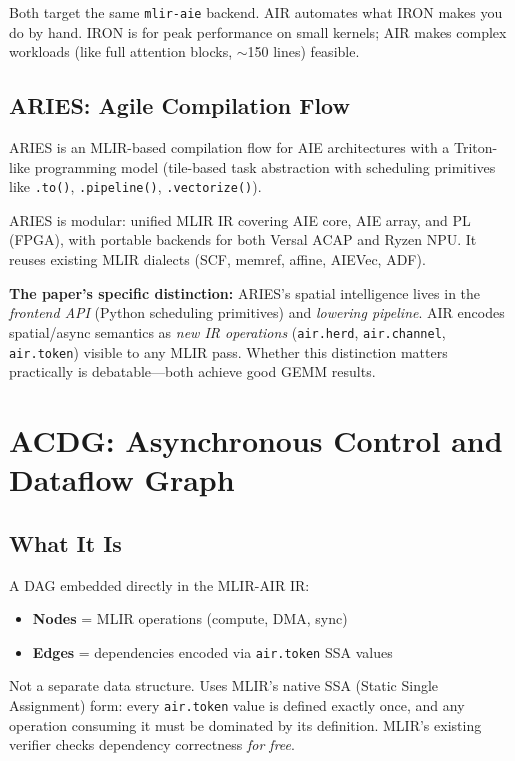 \documentclass[11pt,a4paper]{article}
\begin{document}
Both target the same \texttt{mlir-aie} backend. AIR automates what IRON makes
you do by hand. IRON is for peak performance on small kernels; AIR makes complex
workloads (like full attention blocks, $\sim$150 lines) feasible.

\subsection{ARIES: Agile Compilation Flow}

ARIES is an MLIR-based compilation flow for AIE architectures with a Triton-like
programming model (tile-based task abstraction with scheduling primitives like
\texttt{.to()}, \texttt{.pipeline()}, \texttt{.vectorize()}).

ARIES is modular: unified MLIR IR covering AIE core, AIE array, and PL (FPGA),
with portable backends for both Versal ACAP and Ryzen NPU. It reuses existing MLIR
dialects (SCF, memref, affine, AIEVec, ADF).

\textbf{The paper's specific distinction:} ARIES's spatial intelligence lives in the
\emph{frontend API} (Python scheduling primitives) and \emph{lowering pipeline}.
AIR encodes spatial/async semantics as \emph{new IR operations}
(\texttt{air.herd}, \texttt{air.channel}, \texttt{air.token}) visible to any MLIR
pass. Whether this distinction matters practically is debatable---both achieve good
GEMM results.


\section{ACDG: Asynchronous Control and Dataflow Graph}

\subsection{What It Is}

A DAG embedded directly in the MLIR-AIR IR:
\begin{itemize}[leftmargin=2em]
  \item \textbf{Nodes} = MLIR operations (compute, DMA, sync)
  \item \textbf{Edges} = dependencies encoded via \texttt{air.token} SSA values
\end{itemize}

Not a separate data structure. Uses MLIR's native SSA (Static Single Assignment)
form: every \texttt{air.token} value is defined exactly once, and any operation
consuming it must be dominated by its definition. MLIR's existing verifier checks
dependency correctness \emph{for free}.
\end{document}
